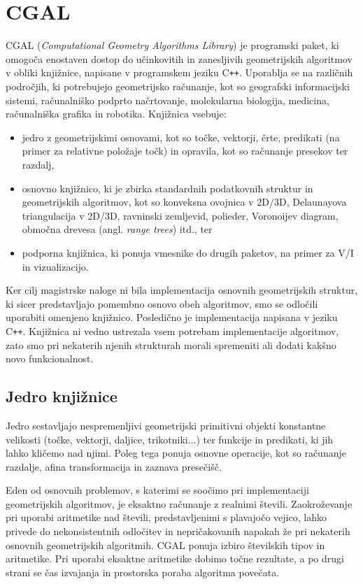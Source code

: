\documentclass[a4paper, 12pt]{book}
\begin{document}
\section{CGAL}
CGAL (\textit{Computational Geometry Algorithms Library}) je programski paket, ki omogoča enostaven dostop do učinkovitih in zanesljivih geometrijskih algoritmov v obliki knjižnice, napisane v programskem jeziku C\texttt{+}\texttt{+}. Uporablja se na različnih področjih, ki potrebujejo geometrijsko računanje, kot so geografski informacijski sistemi, računalniško podprto načrtovanje, molekularna biologija, medicina, računalniška grafika in robotika. Knjižnica vsebuje:

\begin{itemize}
\item jedro z geometrijskimi osnovami, kot so točke, vektorji, črte, predikati (na primer za relativne položaje točk) in opravila, kot so računanje presekov ter razdalj,
\item osnovno knjižnico, ki je zbirka standardnih podatkovnih struktur in geometrijskih algoritmov, kot so konveksna ovojnica v 2D/3D, Delaunayova triangulacija v 2D/3D, ravninski zemljevid, polieder, Voronoijev diagram, območna drevesa (angl. \textit{range trees}) itd., ter
\item podporna knjižnica, ki ponuja vmesnike do drugih paketov, na primer za V/I in vizualizacijo.
\end{itemize}

Ker cilj magistrske naloge ni bila implementacija osnovnih geometrijskih struktur, ki sicer predstavljajo pomembno osnovo obeh algoritmov, smo se odločili uporabiti omenjeno knjižnico. Posledično je implementacija napisana v jeziku C\texttt{+}\texttt{+}. Knjižnica ni vedno ustrezala vsem potrebam implementacije algoritmov, zato smo pri nekaterih njenih strukturah morali spremeniti ali dodati kakšno novo funkcionalnost. 

\subsection{Jedro knjižnice}
Jedro sestavljajo nespremenljivi geometrijski primitivni objekti konstantne velikosti (točke, vektorji, daljice, trikotniki...) ter funkcije in predikati, ki jih lahko kličemo nad njimi. Poleg tega ponuja osnovne operacije, kot so računanje razdalje, afina transformacija in zaznava presečišč. 

Eden od osnovnih problemov, s katerimi se soočimo pri implementaciji geometrijskih algoritmov, je eksaktno računanje z realnimi števili. Zaokroževanje pri uporabi aritmetike nad števili, predstavljenimi s plavajočo vejico, lahko privede do nekonsistentnih odločitev in nepričakovanih napakah že pri nekaterih osnovnih geometrijskih algoritmih. CGAL ponuja izbiro številskih tipov in aritmetike. Pri uporabi eksaktne aritmetike dobimo točne rezultate, a po drugi strani se čas izvajanja in prostorska poraba algoritma povečata.
\end{document}
